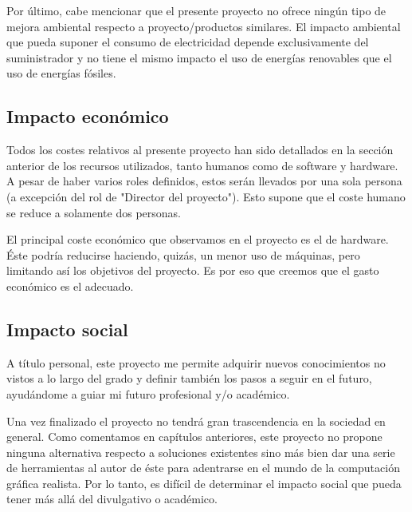 \documentclass[titlepage,12pt]{report}
\begin{document}
Por último, cabe mencionar que el presente proyecto no ofrece ningún tipo de mejora ambiental respecto a proyecto/productos similares. El impacto ambiental que pueda suponer el consumo de electricidad depende exclusivamente del suministrador y no tiene el mismo impacto el uso de energías renovables que el uso de energías fósiles.

\subsection{Impacto económico}

Todos los costes relativos al presente proyecto han sido detallados en la sección anterior de los recursos utilizados, tanto humanos como de software y hardware. A pesar de haber varios roles definidos, estos serán llevados por una sola persona (a excepción del rol de "Director del proyecto"). Esto supone que el coste humano se reduce a solamente dos personas. 

El principal coste económico que observamos en el proyecto es el de hardware. Éste podría reducirse haciendo, quizás, un menor uso de máquinas, pero limitando así los objetivos del proyecto. Es por eso que creemos que el gasto económico es el adecuado.

\subsection{Impacto social}

A título personal, este proyecto me permite adquirir nuevos conocimientos no vistos a lo largo del grado y definir también los pasos a seguir en el futuro, ayudándome a guiar mi futuro profesional y/o académico.

Una vez finalizado el proyecto no tendrá gran trascendencia en la sociedad en general. Como comentamos en capítulos anteriores, este proyecto no propone ninguna alternativa respecto a soluciones existentes sino más bien dar una serie de herramientas al autor de éste para adentrarse en el mundo de la computación gráfica realista. Por lo tanto, es difícil de determinar el impacto social que pueda tener más allá del divulgativo o académico.

\newpage
\nocite{*}

\printbibliography
\listoffigures
\listoftables
\end{document}
